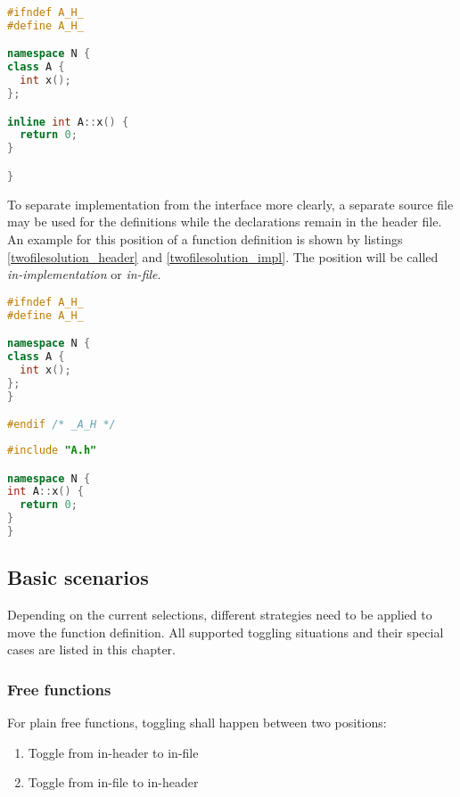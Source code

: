 \begin{lstlisting}[caption={In-header implementation in A.h},
label={inheaderimpl}, language=C++ ]
#ifndef A_H_
#define A_H_

namespace N {
class A {
  int x();
};

inline int A::x() {
  return 0;
}

}
\end{lstlisting}

To  separate implementation from the interface more 
clearly, a separate source file may be used for the definitions while the 
declarations remain in the header file. An example for this position of a 
function definition is shown by listings \ref{twofilesolution_header} and
\ref{twofilesolution_impl}. The position will be called 
\textit{in-implementation} or \textit{in-file}.

\vspace{0.5cm}
\begin{minipage}{.48\textwidth}
\lstset{xrightmargin=0.5cm}
\begin{lstlisting}[caption={A.h},label={twofilesolution_header},language=C++]
#ifndef A_H_
#define A_H_

namespace N {
class A {
  int x();
};
}

#endif /* _A_H */
\end{lstlisting}
\end{minipage}%
\begin{minipage}{.48\textwidth}
\lstset{xleftmargin=0.5cm}
\begin{lstlisting}[caption={A.cpp},label={twofilesolution_impl},language=C++]
#include "A.h"

namespace N {
int A::x() { 
  return 0;
}
}
\end{lstlisting}
\end{minipage}

\subsection{Basic scenarios}

Depending on the current selections, different strategies need to be applied to 
move the function definition. All supported toggling situations and their 
special cases are listed in this chapter.

\subsubsection{Free functions}
For plain free functions, toggling shall happen between two positions:
\begin{enumerate}
\item Toggle from in-header to in-file
\item Toggle from in-file to in-header
\end{enumerate}

